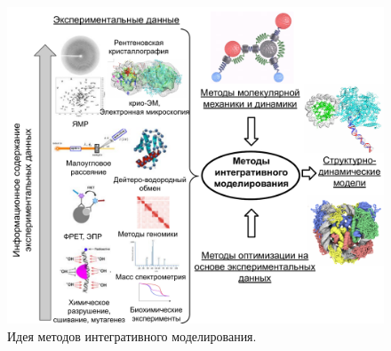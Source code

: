 


\begin{figure}[h!] 
 \center
 \includegraphics[width=\textwidth] {images/p1/int_mod.pdf}
 \caption{Идея методов интегративного моделирования.} 
 \label{fig:p1:int_mod}
\end{figure}





